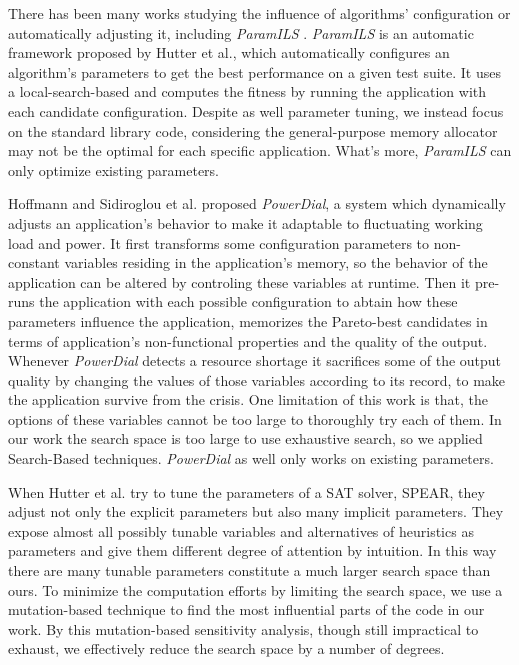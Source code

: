 There has been many works studying the influence of algorithms' configuration or automatically adjusting it, including \emph{ParamILS} \cite{hutter2009paramils}. \emph{ParamILS} is an automatic framework proposed by Hutter et al., which automatically configures an algorithm's parameters to get the best performance on a given test suite. It uses a local-search-based and computes the fitness by running the application with each candidate configuration. Despite as well parameter tuning, we instead focus on the standard library code, considering the general-purpose memory allocator may not be the optimal for each specific application. What's more, \emph{ParamILS} can only optimize existing parameters. 

Hoffmann and Sidiroglou et al.\cite{Hoffmann:2011:DKR:1961296.1950390} proposed \emph{PowerDial}, a system which dynamically adjusts an application's behavior to make it adaptable to fluctuating working load and power. It first transforms some configuration parameters to non-constant variables residing in the application's memory, so the behavior of the application can be altered by controling these variables at runtime. Then it pre-runs the application with each possible configuration to abtain how these parameters influence the application, memorizes the Pareto-best candidates in terms of application's non-functional properties and the quality of the output. Whenever \emph{PowerDial} detects a resource shortage it sacrifices some of the output quality by changing the values of those variables according to its record, to make the application survive from the crisis. One limitation of this work is that, the options of these variables cannot be too large to thoroughly try each of them. In our work the search space is too large to use exhaustive search, so we applied Search-Based techniques. \emph{PowerDial} as well only works on existing parameters.

When Hutter et al.\cite{4401979} try to tune the parameters of a SAT solver, SPEAR, they adjust not only the explicit parameters but also many implicit parameters. They expose almost all possibly tunable variables and alternatives of heuristics as parameters and give them different degree of attention by intuition. In this way there are many tunable parameters constitute a much larger search space than ours. To minimize the computation efforts by limiting the search space, we use a mutation-based technique to find the most influential parts of the code in our work. By this mutation-based sensitivity analysis, though still impractical to exhaust, we effectively reduce the search space by a number of degrees.
